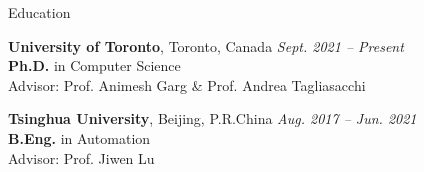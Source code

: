 \documentclass{resume} %
\begin{document}

\begin{rSection}{Education}

{\textbf{University of Toronto}}, {Toronto, Canada} \hfill {\em Sept. 2021 -- Present}\\
\textbf{Ph.D.} in Computer Science\\
Advisor: Prof. Animesh Garg \& Prof. Andrea Tagliasacchi


{\textbf{Tsinghua University}}, {Beijing, P.R.China} \hfill {\em Aug. 2017 -- Jun. 2021}\\
\textbf{B.Eng.} in Automation\\
Advisor: Prof. Jiwen Lu


\end{rSection}
\end{document}
